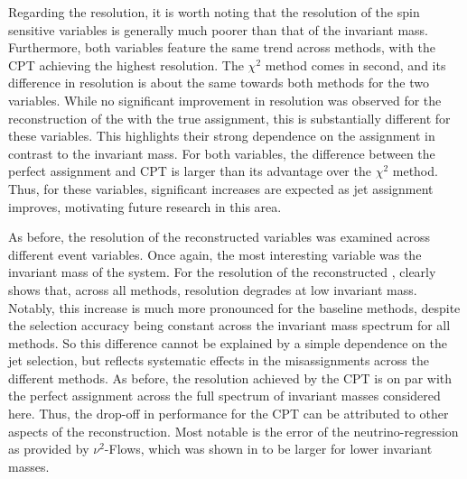 Regarding the resolution, it is worth noting that the resolution of the spin sensitive variables is generally much poorer than that of the invariant mass. Furthermore, both variables feature the same trend across methods, with the CPT achieving the highest resolution. The $\chi^2$ method comes in second, and its difference in resolution is about the same towards both methods for the two variables. While no significant improvement in resolution was observed for the reconstruction of the \mttbar with the true assignment, this is substantially different for these variables. This highlights their strong dependence on the assignment in contrast to the invariant mass. For both variables, the difference between the perfect assignment and CPT is larger than its advantage over the $\chi^2$ method. Thus, for these variables, significant increases are expected as jet assignment improves, motivating future research in this area.

As before, the resolution of the reconstructed variables was examined across different event variables. Once again, the most interesting variable was the invariant mass of the \ttbar system.
For the resolution of the reconstructed \mttbar,  clearly shows that, across all methods, resolution degrades at low invariant mass.
Notably, this increase is much more pronounced for the baseline methods, despite the selection accuracy being constant across the invariant mass spectrum for all methods. So this difference cannot be explained by a simple dependence on the jet selection, but reflects systematic effects in the misassignments across the different methods. As before, the resolution achieved by the CPT is on par with the perfect assignment across the full spectrum of invariant masses considered here. Thus, the drop-off in performance for the CPT can be attributed to other aspects of the reconstruction. Most notable is the error of the neutrino-regression as provided by $\nu^2$-Flows, which was shown in  to be larger for lower invariant masses.

